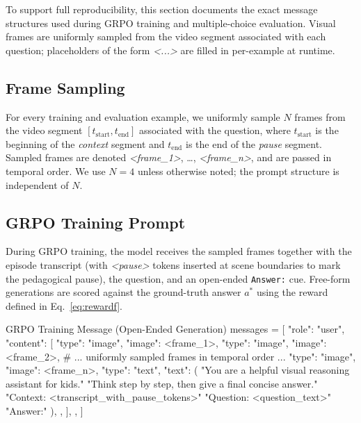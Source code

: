 \documentclass{article}
\begin{document}
To support full reproducibility, this section documents the exact message
structures used during GRPO training and multiple-choice evaluation. Visual frames are uniformly
sampled from the video segment associated with each question; placeholders
of the form \textcolor{promptplaceholder}{\textit{<...>}} are filled in
per-example at runtime.
 
\subsection{Frame Sampling}
 
For every training and evaluation example, we uniformly sample $N$ frames
from the video segment $[t_{\text{start}}, t_{\text{end}}]$ associated
with the question, where $t_{\text{start}}$ is the beginning of the
\textit{context} segment and $t_{\text{end}}$ is the end of the
\textit{pause} segment. Sampled frames are denoted
\textcolor{promptplaceholder}{\textit{<frame\_1>}}, \dots,
\textcolor{promptplaceholder}{\textit{<frame\_n>}}, and are passed in
temporal order. We use $N{=}4$ unless otherwise noted; the prompt
structure is independent of $N$.
 
\subsection{GRPO Training Prompt}
 
During GRPO training, the model receives the sampled frames together with
the episode transcript (with \textcolor{promptplaceholder}{\textit{<pause>}}
tokens inserted at scene boundaries to mark the pedagogical pause), the
question, and an open-ended \texttt{Answer:} cue. Free-form generations are
scored against the ground-truth answer $a^{*}$ using the reward defined
in Eq.~\ref{eq:rewardf}.
 
\begin{promptbox}{GRPO Training Message (Open-Ended Generation)}
messages = [
    {
        "role": "user",
        "content": [
            {"type": "image", "image": <frame_1>},
            {"type": "image", "image": <frame_2>},
            # ... uniformly sampled frames in temporal order ...
            {"type": "image", "image": <frame_n>},
            {
                "type": "text",
                "text": (
                    "You are a helpful visual reasoning assistant for kids.\n"
                    "Think step by step, then give a final concise answer.\n"
                    "Context: <transcript_with_pause_tokens>\n"
                    "Question: <question_text>\n"
                    "Answer:"
                ),
            },
        ],
    },
]
\end{promptbox}
 
\end{document}
